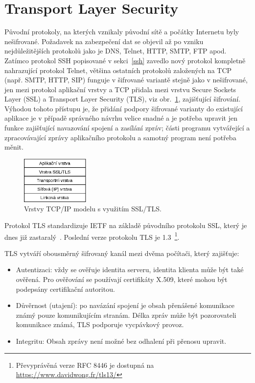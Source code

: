 \section{Transport Layer Security}
\label{tls}

Původní protokoly, na kterých vznikaly původní sítě a počátky Internetu byly
nešifrované. Požadavek na zabezpečení dat se objevil až po vzniku
nejdůležitějších protokolů jako je DNS, Telnet, HTTP, SMTP, FTP apod. Zatímco
protokol SSH popisované v sekci~\ref{ssh} zavedlo nový protokol kompletně
nahrazující protokol Telnet, většina ostatních protokolů založených na TCP
(např. SMTP, HTTP, SIP) funguje v šifrované variantě stejně jako v nešifrované,
jen mezi protokol aplikační vrstvy a TCP přidala mezi vrstvu Secure Sockets
Layer (SSL) a Transport Layer Security (TLS), viz obr.~\ref{fig:tls},
zajišťující šifrování. Výhodou tohoto přístupu je, že přidání podpory šifrované
varianty do existující aplikace je v případě správného návrhu velice snadné a je
potřeba upravit jen funkce zajišťující navazování spojení a zasílání zpráv;
části programu vytvářející a zpracovávající zprávy aplikačního protokolu a
samotný program není potřeba měnit.

\begin{figure}[h!]
  \centering
    \includegraphics[width=0.3\textwidth]{fig/vrstvy-ssl}
  \caption{Vrstvy TCP/IP modelu s využitím SSL/TLS.}
 \label{fig:tls}
\end{figure}

Protokol TLS standardizuje IETF na základě původního protokolu SSL, který je
dnes již zastaralý~\cite{RFC7568}. Poslední verze protokolu TLS je
1.3~\cite{RFC8446}\footnote{Převyprávěná verze RFC 8446 je dostupná na \url{https://www.davidwong.fr/tls13/}}.

TLS vytváří obousměrný šifrovaný kanál mezi dvěma počítači, který zajišťuje:

\begin{itemize}

  \item Autentizaci: vždy se ověřuje identita serveru, identita klienta může být
  také ověřená. Pro ověřování se používají certifikáty X.509, které mohou být
  podepsány certifikační autoritou.

  \item Důvěrnost (utajení): po navázání spojení je obsah přenášené komunikace
  známý pouze komunikujícím stranám. Délka zpráv může být pozorovateli
  komunikace známá, TLS podporuje vycpávkový provoz.

  \item Integritu: Obsah zprávy není možné bez odhalení při přenosu upravit.

\end{itemize}

